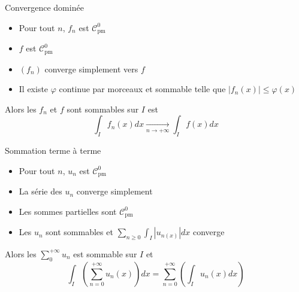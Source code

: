 \documentclass[french, a4paper, 10pt, twocolumn]{article}
\newcommand{\czero}{\mathcal{C}^{0}}
\newcommand{\po}{\left(}         %
\newcommand{\pf}{\right)}        %
\newcommand{\pof}[1]{\po #1 \pf} %
\renewcommand{\phi}{\varphi}
\begin{document}
\begin{theoreme}{Convergence dominée}
  \begin{itemize}[label=$\bullet$]
    \item Pour tout $n$, $f_{n}$ est $\czero_{\text{pm}}$
    \item $f$ est $\czero_{\text{pm}}$
    \item $(f_{n})$ converge simplement vers $f$
    \item Il existe $\phi$ continue par morceaux et sommable telle que \(\left\lvert f_{n}(x)\right\rvert\leqslant \phi(x)\)
  \end{itemize}
  \tcblower
  Alors les $f_{n}$ et $f$ sont sommables sur $I$ est
  \[\int_{I}f_{n}(x)dx\xrightarrow[n\rightarrow +\infty]{}\int_{I}f(x)dx\]
\end{theoreme}

\begin{theoreme}{Sommation terme à terme}
  \begin{itemize}[label=$\bullet$]
    \item Pour tout $n$, $u_{n}$ est $\czero_{\text{pm}}$
    \item La série des $u_{n}$ converge simplement
    \item Les sommes partielles sont $\czero_{\text{pm}}$
    \item Les $u_{n}$ sont sommables et $\sum_{n\geqslant 0}\int_I |u_{n(x)}|dx$ converge

  \end{itemize}
  \tcblower
  Alors les $\sum\limits_{0}^{+\infty}u_{n}$ est sommable sur $I$ et
  \[\int_{I}\pof{\sum_{n=0}^{+\infty}u_{n}(x)}dx = \sum_{n=0}^{+\infty} \pof{\int_{I}u_{n}(x)dx}\]
\end{theoreme}
\end{document}
